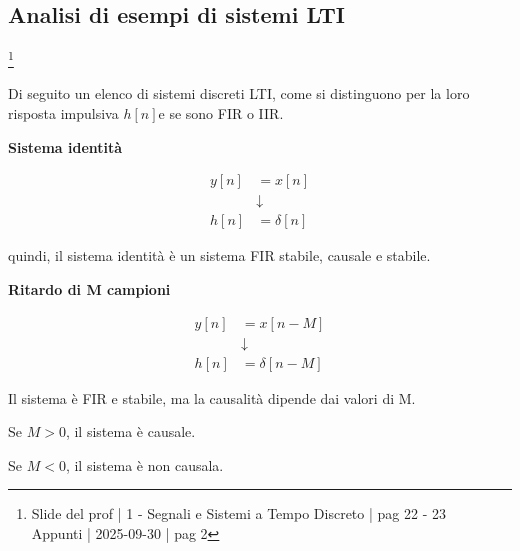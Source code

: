 \newpage 

\subsection{Analisi di esempi di sistemi LTI }

\footnote{ 
    Slide del prof | 1 - Segnali e Sistemi a Tempo Discreto | pag 22 - 23\\
    Appunti | 2025-09-30 | pag 2
}

Di seguito un elenco di sistemi discreti LTI, come si distinguono per la loro risposta impulsiva $h \left[ n\right]$e se sono FIR o IIR. \newline 

\textbf{Sistema identità} \newline 

{
    \Large 
    \begin{equation}
        \begin{split}
            y \left[ n\right] &= x \left[ n \right]
            \\
            &\downarrow
            \\
            h \left[ n \right] &= \delta \left[ n\right]
        \end{split}
    \end{equation}
}

quindi, il sistema identità è un sistema FIR stabile, causale e stabile. \newline 

\textbf{Ritardo di M campioni} \newline 

{
    \Large 
    \begin{equation}
        \begin{split}
            y \left[ n\right] &= x \left[ n - M\right]
            \\
            &\downarrow
            \\
            h \left[ n \right] &= \delta \left[ n - M\right]
        \end{split}
    \end{equation}
}

Il sistema è FIR e stabile, ma la causalità dipende dai valori di M. \newline 

Se $M > 0$, il sistema è causale. \newline  

Se $M < 0$, il sistema è non causala. \newline 

